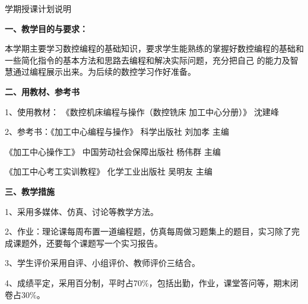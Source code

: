 \documentclass{ctexart}
\begin{document}

\jhsy %

\begin{center}
 \heiti 学期授课计划说明
\end{center}
 \setlength{\parindent}{2em} \setlength{\baselineskip}{22pt}

\textbf{一、教学目的与要求：}

本学期主要学习数控编程的基础知识，要求学生能熟练的掌握好数控编程的基础和一些简化指令的基本方法和思路去编程和解决实际问题，充分把自己 的能力及智慧通过编程展示出来。为后续的数控学习作好准备。

\textbf{二、用教材、参考书}

1、使用教材： 《数控机床编程与操作（数控铣床 加工中心分册）》 沈建峰

2、参考书：《加工中心编程与操作》  科学出版社  刘加孝   主编

\hspace{5em}《加工中心操作工》 中国劳动社会保障出版社  杨伟群  主编

\hspace{5em}《加工中心考工实训教程》  化学工业出版社   吴明友 主编

\textbf{三、教学措施}

1、采用多媒体、仿真、讨论等教学方法。

2、作业：理论课每周布置一道编程题，仿真每周做习题集上的题目，实习除了完成课题外，还要每个课题写一个实习报告。

3、学生评价采用自评、小组评价、教师评价三结合。

4、成绩平定，采用百分制，平时占70\%，包括出勤，作业，课堂答问等，期末闭卷占30\%。
\end{document}
